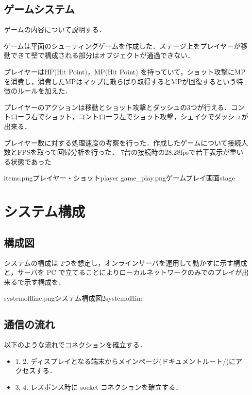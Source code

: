 \subsection{ゲームシステム}
ゲームの内容について説明する．

ゲームは平面のシューティングゲームを作成した．ステージ上をプレイヤーが移動できて壁で構成される部分はオブジェクトが通過できない．

プレイヤーはHP(Hit Point)，MP(Hit Point) を持っていて，ショット攻撃にMPを消費し，消費したMPはマップに散らばり取得するとMPが回復するという特徴のルールを加えた．

プレイヤーのアクションは移動とショット攻撃とダッシュの3つが行える．コントローラ右でショット，コントローラ左でショット攻撃，シェイクでダッシュが出来る．

プレイヤー数に対する処理速度の考察を行った．作成したゲームについて接続人数とFPSを取って回帰分析を行った．
7台の接続時の28.28fpsで若干表示が重いる状態であった

\myfigtwo
{items.png}{プレイヤー・ショット}{player}
{game_play.png}{ゲームプレイ画面}{stage}


\newpage
\section{システム構成}
\subsection{構成図}
システムの構成は 2つを想定し，オンラインサーバを運用して動かすに示す構成と，サーバを PC で立てることによりローカルネットワークのみでのプレイが出来るで示す構成を．

{systemoffline.png}{システム構成図2}{systemoffline}

\subsection{通信の流れ}
以下のような流れでコネクションを確立する．
\begin{itemize}
    \item 1, 2. ディスプレイとなる端末からメインページ(ドキュメントルート/)にアクセスする．
    \item 3, 4. レスポンス時に socket コネクションを確立する．
\end{itemize}

